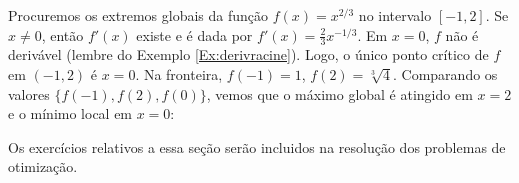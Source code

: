 \begin{ex}
Procuremos os extremos globais da função $f(x)=x^{2/3}$ no intervalo
$[-1,2]$.
Se $x\neq 0$, então $f'(x)$ existe e é dada por $f'(x)=\tfrac23x^{-1/3}$. 
Em $x=0$, $f$ não é derivável (lembre do Exemplo \ref{Ex:derivracine}). 
Logo, o único ponto crítico de $f$ em $(-1,2)$ é $x=0$. 
Na fronteira, $f(-1)=1$, $f(2)=\sqrt[3]{4}$. Comparando os valores 
$\{f(-1),f(2),f(0)\}$, vemos que o máximo global é atingido em $x=2$ e o mínimo
local em $x=0$:
\begin{center}
\begin{bmlimage}\end{bmlimage}
\end{center}
\end{ex}

Os exercícios relativos a essa seção serão incluidos na resolução dos
problemas de otimização.


